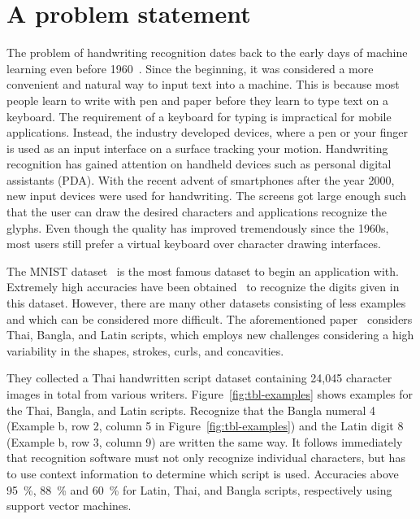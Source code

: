 \section{A problem statement}
\label{sec:problem-statement}
%
The problem of handwriting recognition dates back to the early days of machine learning even before 1960~\cite{5244320}.
Since the beginning, it was considered a more convenient and natural way to input text into a machine.
This is because most people learn to write with pen and paper before they learn to type text on a keyboard.
The requirement of a keyboard for typing is impractical for mobile applications.
Instead, the industry developed devices, where a pen or your finger is used as an input interface on a surface tracking your motion.
Handwriting recognition has gained attention on handheld devices such as personal digital assistants (PDA).
With the recent advent of smartphones after the year 2000, new input devices were used for handwriting.
The screens got large enough such that the user can draw the desired characters and applications recognize the glyphs.
Even though the quality has improved tremendously since the 1960s, most users still prefer a virtual keyboard over character drawing interfaces.

The MNIST dataset~\cite{lecun1998mnist} is the most famous dataset to begin an application with.
Extremely high accuracies have been obtained~\cite{surinta2015recognition} to recognize the digits given in this dataset.
However, there are many other datasets consisting of less examples and which can be considered more difficult.
The aforementioned paper~\cite{surinta2015recognition} considers Thai, Bangla, and Latin scripts, which employs new challenges considering a high variability in the shapes, strokes, curls, and concavities.

They collected a Thai handwritten script dataset containing 24,045 character images in total from various writers.
Figure~\ref{fig:tbl-examples} shows examples for the Thai, Bangla, and Latin scripts.
Recognize that the Bangla numeral 4 (Example b, row 2, column 5 in Figure~\ref{fig:tbl-examples}) and the Latin digit 8 (Example b, row 3, column 9) are written the same way.
It follows immediately that recognition software must not only recognize individual characters, but has to use context information to determine which script is used.
Accuracies above 95~\%, 88~\% and 60~\% for Latin, Thai, and Bangla scripts, respectively using support vector machines.

